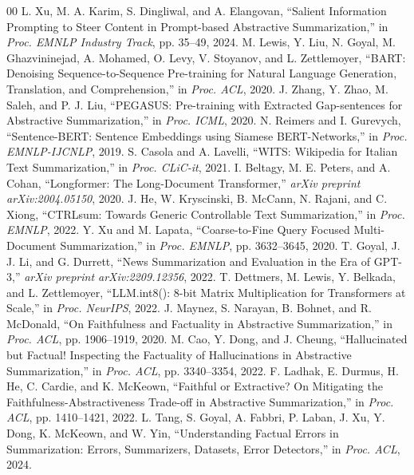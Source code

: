 \documentclass[conference]{IEEEtran}
\begin{document}
\begin{thebibliography}{00}
 L. Xu, M. A. Karim, S. Dingliwal, and A. Elangovan, ``Salient Information Prompting to Steer Content in Prompt-based Abstractive Summarization,'' in \textit{Proc. EMNLP Industry Track}, pp. 35--49, 2024.
 M. Lewis, Y. Liu, N. Goyal, M. Ghazvininejad, A. Mohamed, O. Levy, V. Stoyanov, and L. Zettlemoyer, ``BART: Denoising Sequence-to-Sequence Pre-training for Natural Language Generation, Translation, and Comprehension,'' in \textit{Proc. ACL}, 2020.
 J. Zhang, Y. Zhao, M. Saleh, and P. J. Liu, ``PEGASUS: Pre-training with Extracted Gap-sentences for Abstractive Summarization,'' in \textit{Proc. ICML}, 2020.
 N. Reimers and I. Gurevych, ``Sentence-BERT: Sentence Embeddings using Siamese BERT-Networks,'' in \textit{Proc. EMNLP-IJCNLP}, 2019.
 S. Casola and A. Lavelli, ``WITS: Wikipedia for Italian Text Summarization,'' in \textit{Proc. CLiC-it}, 2021.
 I. Beltagy, M. E. Peters, and A. Cohan, ``Longformer: The Long-Document Transformer,'' \textit{arXiv preprint arXiv:2004.05150}, 2020.
 J. He, W. Kryscinski, B. McCann, N. Rajani, and C. Xiong, ``CTRLsum: Towards Generic Controllable Text Summarization,'' in \textit{Proc. EMNLP}, 2022.
 Y. Xu and M. Lapata, ``Coarse-to-Fine Query Focused Multi-Document Summarization,'' in \textit{Proc. EMNLP}, pp. 3632--3645, 2020.
 T. Goyal, J. J. Li, and G. Durrett, ``News Summarization and Evaluation in the Era of GPT-3,'' \textit{arXiv preprint arXiv:2209.12356}, 2022.
 T. Dettmers, M. Lewis, Y. Belkada, and L. Zettlemoyer, ``LLM.int8(): 8-bit Matrix Multiplication for Transformers at Scale,'' in \textit{Proc. NeurIPS}, 2022.
 J. Maynez, S. Narayan, B. Bohnet, and R. McDonald, ``On Faithfulness and Factuality in Abstractive Summarization,'' in \textit{Proc. ACL}, pp. 1906--1919, 2020.
 M. Cao, Y. Dong, and J. Cheung, ``Hallucinated but Factual! Inspecting the Factuality of Hallucinations in Abstractive Summarization,'' in \textit{Proc. ACL}, pp. 3340--3354, 2022.
 F. Ladhak, E. Durmus, H. He, C. Cardie, and K. McKeown, ``Faithful or Extractive? On Mitigating the Faithfulness-Abstractiveness Trade-off in Abstractive Summarization,'' in \textit{Proc. ACL}, pp. 1410--1421, 2022.
 L. Tang, S. Goyal, A. Fabbri, P. Laban, J. Xu, Y. Dong, K. McKeown, and W. Yin, ``Understanding Factual Errors in Summarization: Errors, Summarizers, Datasets, Error Detectors,'' in \textit{Proc. ACL}, 2024.
\end{thebibliography}
\end{document}
